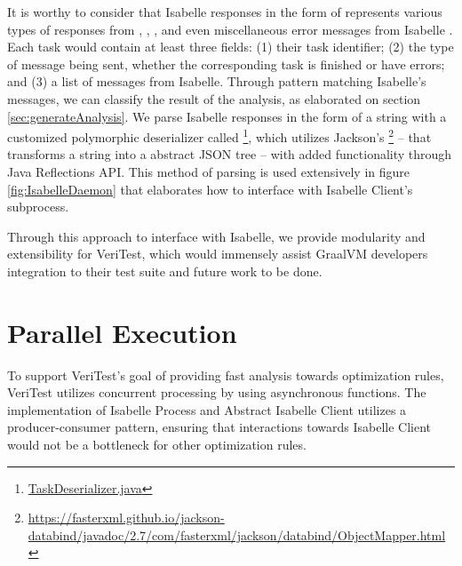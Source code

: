 It is worthy to consider that Isabelle responses in the form of  represents various types of responses from , 
, , and even miscellaneous error messages from Isabelle \cite[Sec. 4.4]{isabelleSystem}. 
Each task would contain at least three fields: (1) their task identifier; (2) the type of message being sent, whether the corresponding task 
is finished or have errors; and (3) a list of messages from Isabelle. Through pattern matching Isabelle's messages, we can classify the result 
of the analysis, as elaborated on section \ref{sec:generateAnalysis}. We parse 
Isabelle responses in the form of a string with a customized polymorphic deserializer called \footnote{\href{https://github.com/achmadafriza/veritest-dev/blob/master/src/main/java/com/veriopt/veritest/isabelle/TaskDeserializer.java}{TaskDeserializer.java}}, 
which utilizes Jackson's \footnote{\href{jackson-databind 2.7.0 {API}}{https://fasterxml.github.io/jackson-databind/javadoc/2.7/com/fasterxml/jackson/databind/ObjectMapper.html}}
 -- that transforms a string into a abstract JSON tree -- with added functionality through Java Reflections API. This method of parsing 
is used extensively in figure \ref{fig:IsabelleDaemon} that elaborates how to interface with Isabelle Client's subprocess.

Through this approach to interface with Isabelle, we provide modularity and extensibility for VeriTest, which would immensely assist 
GraalVM developers integration to their test suite and future work to be done.

\section{Parallel Execution}
\label{sec:ParallelExecution}

To support VeriTest's goal of providing fast analysis towards optimization rules, VeriTest utilizes concurrent processing by using asynchronous 
functions. The implementation of Isabelle Process and Abstract Isabelle Client utilizes a producer-consumer pattern, ensuring 
that interactions towards Isabelle Client would not be a bottleneck for other optimization rules.

